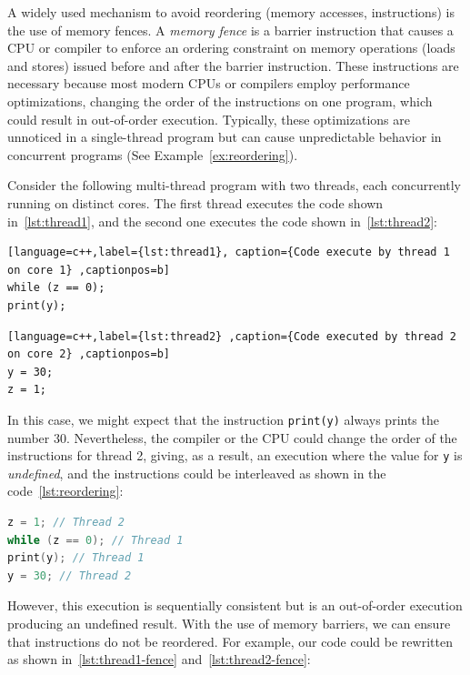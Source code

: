 A widely used mechanism to avoid reordering (memory accesses, instructions) is the use of memory fences. A \emph{memory fence} is a barrier instruction that causes a CPU or compiler to enforce an ordering constraint on memory operations (loads and stores) issued before and after the barrier instruction. These instructions are necessary because most modern CPUs or compilers employ performance optimizations, changing the order of the instructions on one program, which could result in out-of-order execution. Typically, these optimizations are unnoticed in a single-thread program but can cause unpredictable behavior in concurrent programs (See Example~\ref{ex:reordering}).

\begin{example}
\label{ex:reordering}
Consider the following multi-thread program with two threads, each concurrently running on distinct cores. The first thread executes the code shown in~\ref{lst:thread1}, and the second one executes the code shown in~\ref{lst:thread2}:

\begin{lstlisting}[language=c++,label={lst:thread1}, caption={Code execute by thread 1 on core 1} ,captionpos=b]
while (z == 0);
print(y);
\end{lstlisting}

\begin{lstlisting}[language=c++,label={lst:thread2} ,caption={Code executed by thread 2 on core 2} ,captionpos=b]
y = 30;
z = 1;
\end{lstlisting}


In this case, we might expect that the instruction \texttt{print(y)} always prints the number 30. Nevertheless, the compiler or the CPU could change the order of the instructions for thread 2, giving, as a result, an execution where the value for \texttt{y} is \emph{undefined}, and the instructions could be interleaved as shown in the code~\ref{lst:reordering}:

\begin{lstlisting}[language=c++,label={lst:reordering},caption={Code reordered by CPU}, captionpos=b]
z = 1; // Thread 2
while (z == 0); // Thread 1
print(y); // Thread 1
y = 30; // Thread 2
\end{lstlisting}

However, this execution is sequentially consistent but is an out-of-order execution producing an undefined result. With the use of memory barriers, we can ensure that instructions do not be reordered. For example, our code could be rewritten as shown in~\ref{lst:thread1-fence} and~\ref{lst:thread2-fence}:


\end{example}
